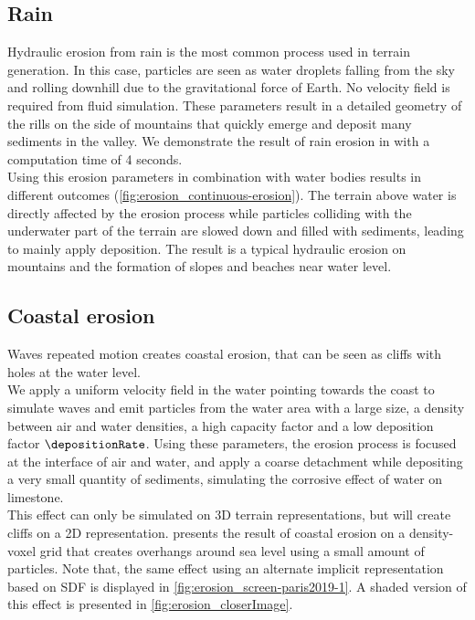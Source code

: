 \subsection{Rain}
Hydraulic erosion from rain is the most common process used in terrain generation. In this case, particles are seen as water droplets falling from the sky and rolling downhill due to the gravitational force of Earth. No velocity field is required from fluid simulation. These parameters result in a detailed geometry of the rills on the side of mountains that quickly emerge and deposit many sediments in the valley.  
We demonstrate the result of rain erosion in  with a computation time of 4 seconds.  \\
Using this erosion parameters in combination with water bodies results in different outcomes (\cref{fig:erosion_continuous-erosion}). The terrain above water is directly affected by the erosion process while particles colliding with the underwater part of the terrain are slowed down and filled with sediments, leading to mainly apply deposition. The result is a typical hydraulic erosion on mountains and the formation of slopes and beaches near water level.

\subsection{Coastal erosion}
Waves repeated motion  creates coastal erosion, that can be seen as cliffs with holes at the water level. \\
We apply a uniform velocity field in the water pointing towards the coast to simulate waves and emit particles from the water area with a large size, a density between air and water densities, a high capacity factor and a low deposition factor $\depositionRate$. Using these parameters, the erosion process is focused at the interface of air and water, and apply a coarse detachment while depositing a very small quantity of sediments, simulating the corrosive effect of water on limestone. \\ 
This effect can only be simulated on 3D terrain representations, but will create cliffs on a 2D representation. 
 presents the result of coastal erosion on a density-voxel grid that creates overhangs around sea level using a small amount of particles. Note that, the same effect using an alternate implicit representation based on SDF is displayed in \cref{fig:erosion_screen-paris2019-1}.
A shaded version of this effect is presented in \cref{fig:erosion_closerImage}.

